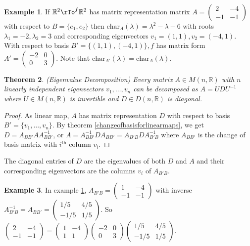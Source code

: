 \documentclass[12pt]{amsart}
\newtheorem{theorem}{Theorem}[section]
\theoremstyle{definition}
\newtheorem{example}[theorem]{Example}
\begin{document}
\begin{example}\label{eigenvalues2} If $\mathbb{R}^2 \rTo^f \mathbb{R}^2$ has matrix representation matrix $A = \left(\begin{array}{cc} 2 & -4 \\ -1 & -1 \end{array}\right)$ with respect to $B = \{e_1, e_2\}$ then $\text{char}_A(\lambda) = \lambda^2 - \lambda - 6$ with roots $\lambda_1 = -2, \lambda_2 = 3$ and corresponding eigenvectors $v_1 = (1,1), v_2 = (-4,1)$. With respect to basis $B' = \{(1,1),(-4,1)\}, f$ has matrix form $A' = \left(\begin{array}{cc} -2 & 0 \\ 0 & 3 \end{array}\right)$. Note that $\text{char}_{A'}(\lambda) = \text{char}_A(\lambda)$.
\end{example}

\begin{theorem}\label{eigenvaluedecomposition} (Eigenvalue Decomposition) Every matrix $A \in M(n, \mathbb{R})$ with $n$ linearly independent eigenvectors $v_1, \dots, v_n$ can be decomposed as $A = UDU^{-1}$ where $U \in M(n, \mathbb{R})$ is invertible and $D \in D(n, \mathbb{R})$ is diagonal.
\end{theorem}
\begin{proof} As linear map, $A$ has matrix representation $D$ with respect to basis $B' = \{v_1, \dots, v_n\}$. By theorem \ref{changeofbasisforlinearmaps}, we get $D = A_{BB'}AA_{BB'}^{-1}$, or $A = A_{BB'}^{-1}DA_{BB'} = A_{B'B}DA_{B'B}^{-1}$ where $A_{BB'}$ is the change of basis matrix with $i^{\text{th}}$ column $v_i$. 
\end{proof}

The diagonal entries of $D$ are the eigenvalues of both $D$ and $A$ and their corresponding eigenvectors are the columns $v_i$ of $A_{B'B}$.

\begin{example}\label{} In example \ref{eigenvalues2}, $A_{B'B} = \left(\begin{array}{cc} 1 & -4 \\ -1 & -1 \end{array}\right)$ with inverse $A_{B'B}^{-1} = A_{BB'} = \left(\begin{array}{cc} 1/5 & 4/5  \\ -1/5 & 1/5 \end{array}\right)$. So $ \left(\begin{array}{cc} 2 & -4 \\ -1 & -1 \end{array}\right) = \left(\begin{array}{cc} 1 & -4 \\ 1 & 1 \end{array}\right) \left(\begin{array}{cc} -2 & 0 \\ 0 & 3 \end{array}\right) \left(\begin{array}{cc} 1/5 & 4/5  \\ -1/5 & 1/5 \end{array}\right)$.
\end{example}
\end{document}
